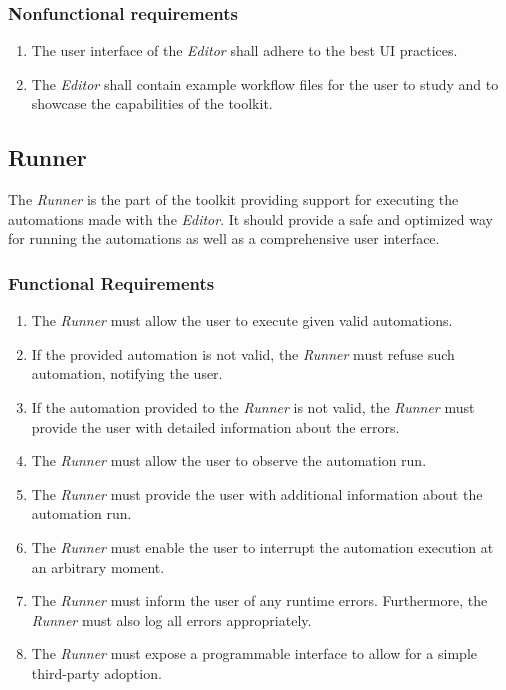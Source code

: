 \subsubsection{Nonfunctional requirements}

\begin{enumerate}[label=\thesubsection.2.\arabic*]
    \item The user interface of the \textit{Editor} shall adhere to the best \ac{UI} practices.
    \item The \textit{Editor} shall contain example workflow files for the user to study and to showcase the capabilities of the toolkit.
\end{enumerate}

\clearpage
\subsection{Runner}

The \textit{Runner} is the part of the toolkit providing support for executing the automations made with the \textit{Editor}.
It should provide a safe and optimized way for running the automations as well as a comprehensive user interface.

\subsubsection{Functional Requirements}

\begin{enumerate}[label=\thesubsection.1.\arabic*]
    \item The \textit{Runner} must allow the user to execute given valid automations. 
    \item If the provided automation is not valid, the \textit{Runner} must refuse such automation, notifying the user.
    \item If the automation provided to the \textit{Runner} is not valid, 
    the \textit{Runner} must provide the user with detailed information about the errors.
    \item The \textit{Runner} must allow the user to observe the automation run.
    \item The \textit{Runner} must provide the user with additional information about the automation run. 
    \item The \textit{Runner} must enable the user to interrupt the automation execution at an arbitrary moment.
    \item The \textit{Runner} must inform the user of any runtime errors. 
    Furthermore, the \textit{Runner} must also log all errors appropriately.
    \item The \textit{Runner} must expose a programmable interface to allow for a simple third-party adoption.
\end{enumerate}

